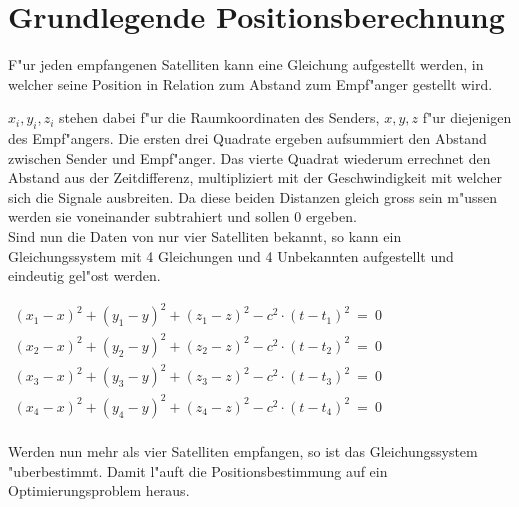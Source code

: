 \section{Grundlegende Positionsberechnung}
	F"ur jeden empfangenen Satelliten kann eine Gleichung aufgestellt werden, in welcher seine Position in Relation zum Abstand zum Empf"anger gestellt wird.
	\begin{center}
	\end{center}
	$x_i, y_i, z_i$ stehen dabei f"ur die Raumkoordinaten des Senders, $x, y, z$ f"ur diejenigen des Empf"angers. Die ersten drei Quadrate ergeben aufsummiert den Abstand zwischen Sender und Empf"anger. Das vierte Quadrat wiederum errechnet den Abstand aus der Zeitdifferenz, multipliziert mit der Geschwindigkeit mit welcher sich die Signale ausbreiten. Da diese beiden Distanzen gleich gross sein m"ussen werden sie voneinander subtrahiert und sollen 0 ergeben.\\[0.2cm]
	Sind nun die Daten von nur vier Satelliten bekannt, so kann ein Gleichungssystem mit 4 Gleichungen und 4 Unbekannten aufgestellt und eindeutig gel"ost werden.\begin{center}
	$\begin{array}{l}
	(x_1 - x)^2 + (y_1 - y)^2 + (z_1 - z)^2 - c^2\cdot(t - t_1)^2 ~=~ 0\\
	(x_2 - x)^2 + (y_2 - y)^2 + (z_2 - z)^2 - c^2\cdot(t - t_2)^2 ~=~ 0\\
	(x_3 - x)^2 + (y_3 - y)^2 + (z_3 - z)^2 - c^2\cdot(t - t_3)^2 ~=~ 0\\
	(x_4 - x)^2 + (y_4 - y)^2 + (z_4 - z)^2 - c^2\cdot(t - t_4)^2 ~=~ 0\\
	\end{array}$                                                                                                                              \end{center}
	Werden nun mehr als vier Satelliten empfangen, so ist das Gleichungssystem "uberbestimmt. Damit l"auft die Positionsbestimmung auf ein Optimierungsproblem heraus.\\

